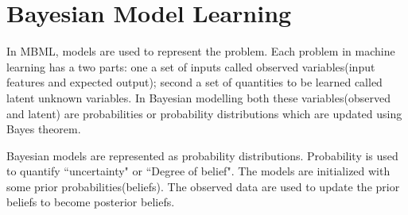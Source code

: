 \section{Bayesian Model Learning}

In MBML, models are used to represent the problem. Each problem in machine learning has a two parts: one a set of inputs called observed variables(input features and expected output); second a set of  quantities to be learned called latent unknown variables. In Bayesian modelling both these variables(observed and latent) are probabilities or probability distributions which are updated using Bayes theorem. 

Bayesian models are represented as probability distributions. Probability is used to quantify ``uncertainty" or ``Degree of belief". The models are initialized with some prior probabilities(beliefs). The observed data are used to update the prior beliefs to become posterior beliefs.
